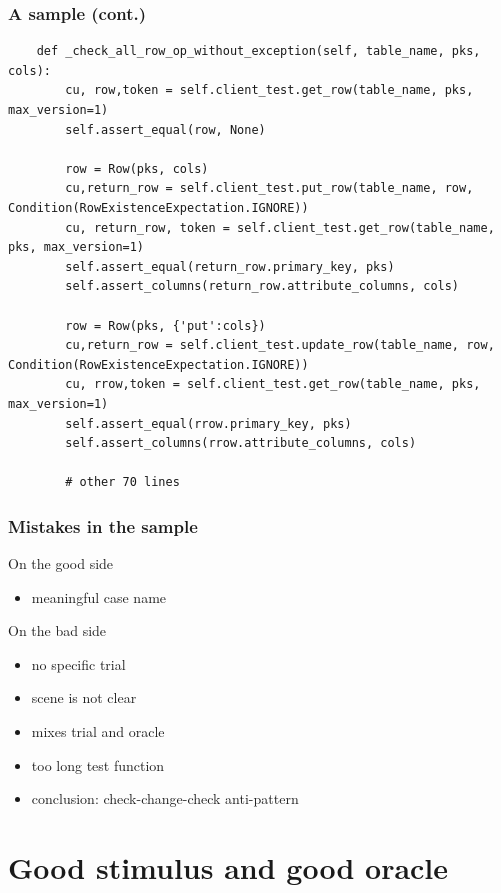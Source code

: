 \documentclass[lualatex]{beamer}
\begin{document}
\begin{frame}[fragile]
  \frametitle{A sample (cont.)}

  \begin{verbatim}
    def _check_all_row_op_without_exception(self, table_name, pks, cols):
        cu, row,token = self.client_test.get_row(table_name, pks, max_version=1)
        self.assert_equal(row, None)
        
        row = Row(pks, cols)
        cu,return_row = self.client_test.put_row(table_name, row, Condition(RowExistenceExpectation.IGNORE))
        cu, return_row, token = self.client_test.get_row(table_name, pks, max_version=1)
        self.assert_equal(return_row.primary_key, pks)
        self.assert_columns(return_row.attribute_columns, cols)

        row = Row(pks, {'put':cols})
        cu,return_row = self.client_test.update_row(table_name, row, Condition(RowExistenceExpectation.IGNORE))
        cu, rrow,token = self.client_test.get_row(table_name, pks, max_version=1)
        self.assert_equal(rrow.primary_key, pks)
        self.assert_columns(rrow.attribute_columns, cols)

        # other 70 lines
  \end{verbatim}
\end{frame}

\begin{frame}
  \frametitle{Mistakes in the sample}

  \begin{block}{On the good side}
    \begin{itemize}
    \item meaningful case name
    \end{itemize}
  \end{block}
  \begin{block}{On the bad side}
    \begin{itemize}
    \item no specific trial
    \item scene is not clear
    \item mixes trial and oracle
    \item too long test function
    \item conclusion: check-change-check anti-pattern
    \end{itemize}
  \end{block}
\end{frame}

\section{Good stimulus and good oracle}
\end{document}
